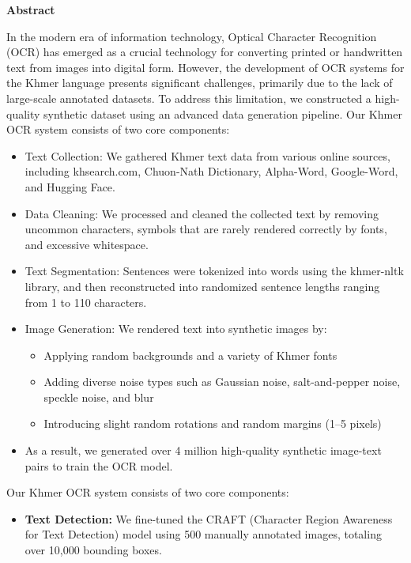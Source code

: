 \begin{adjustwidth}{0.2cm}{0.2cm}
    \begin{center}
        {\bfseries\LARGE Abstract \par}
    \end{center}
    \label{abstract}
    \vspace{0.5cm}
    \englishfont
    \large
    In the modern era of information technology, Optical Character Recognition (OCR) has emerged as a crucial technology for converting printed or handwritten text from images into digital form. However, the development of OCR systems for the Khmer language presents significant challenges, primarily due to the lack of large-scale annotated datasets. To address this limitation, we constructed a high-quality synthetic dataset using an advanced data generation pipeline. Our Khmer OCR system consists of two core components:
    \begin{itemize}[leftmargin=1.5em]
        \item Text Collection: We gathered Khmer text data from various online sources, including khsearch.com, Chuon-Nath Dictionary, Alpha-Word, Google-Word, and Hugging Face.
        \item Data Cleaning: We processed and cleaned the collected text by removing uncommon characters, symbols that are rarely rendered correctly by fonts, and excessive whitespace.
        \item Text Segmentation: Sentences were tokenized into words using the khmer-nltk library, and then reconstructed into randomized sentence lengths ranging from 1 to 110 characters.
        \item Image Generation: We rendered text into synthetic images by:
        \begin{itemize}[leftmargin=2em]
            \item Applying random backgrounds and a variety of Khmer fonts
            \item Adding diverse noise types such as Gaussian noise, salt-and-pepper noise, speckle noise, and blur
            \item Introducing slight random rotations and random margins (1–5 pixels)
        \end{itemize}
        \item As a result, we generated over 4 million high-quality synthetic image-text pairs to train the OCR model.
    \end{itemize}
    \par
    
    \vspace{0.2cm}
    Our Khmer OCR system consists of two core components:
    \begin{itemize}[leftmargin=1.5em]
        \item \textbf{Text Detection:} We fine-tuned the CRAFT (Character Region Awareness for Text Detection) model using 500 manually annotated images, totaling over 10,000 bounding boxes.
        

\end{itemize}
\end{adjustwidth}
